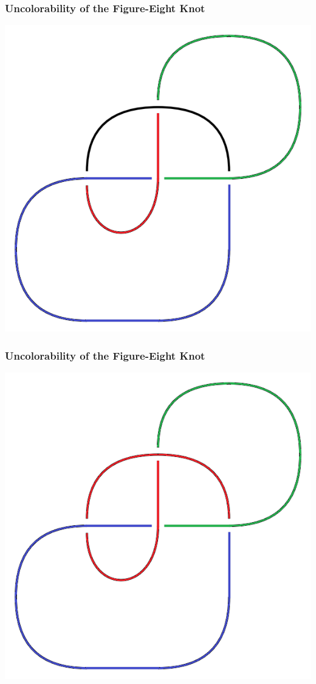\documentclass{beamer}
\begin{document}
\begin{frame}
  \frametitle{Uncolorability of the Figure-Eight Knot}
  \begin{center}
    \includegraphics[scale=.4]{figure-eight-bad3}
  \end{center}
\end{frame}

\begin{frame}
  \frametitle{Uncolorability of the Figure-Eight Knot}
  \begin{center}
    \includegraphics[scale=.4]{figure-eight-bad4}
  \end{center}
\end{frame}
\end{document}
